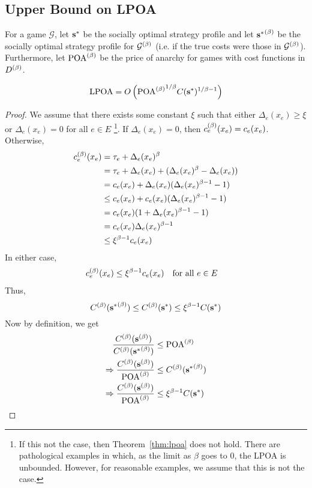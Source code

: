 \documentclass[twoside]{article}
\begin{document}
\begin{multicols}{2}
\section{Upper Bound on LPOA} \label{sec:ub}
For a game $\mathcal{G}$, let $\mathbf{s}^*$ be the socially optimal strategy profile
and let ${\mathbf{s}^*}^{(\beta)}$ be the socially optimal strategy profile for
$\mathcal{G}^{(\beta)}$ (i.e. if the true costs were those in $\mathcal{G}^{(\beta)}$).
Furthermore, let $\text{POA}^{(\beta)}$ be the price of anarchy for games with cost functions in
$D^{(\beta)}$.
\begin{thm} \label{thm:lpoa}
  \[
    \text{LPOA} = O\left({\text{POA}^{(\beta)}}^{1/\beta} C(\mathbf{s}^*)^{1/\beta-1}\right)
  \]
\end{thm}
\begin{proof}
  We assume that there exists some constant $\xi$ such that either
  $\Delta_e(x_e) \ge \xi$ or $\Delta_e(x_e) = 0$ for all $e \in E$
  \footnote{If this not the case, then Theorem~\ref{thm:lpoa} does not hold.
  There are pathological examples in which, as the limit as $\beta$ goes to 0,
  the LPOA is unbounded. However, for reasonable examples, we assume that this
  is not the case.}. If $\Delta_e(x_e) = 0$, then $c_e^{(\beta)}(x_e) = c_e(x_e)$.
  Otherwise,
  \begin{align*}
    c_e^{(\beta)}(x_e) &= \tau_e + \Delta_e(x_e)^\beta \\
    &= \tau_e + \Delta_e(x_e) + (\Delta_e(x_e)^\beta - \Delta_e(x_e)) \\
    &= c_e(x_e) + \Delta_e(x_e)(\Delta_e(x_e)^{\beta-1} - 1) \\
    &\le c_e(x_e) + c_e(x_e)(\Delta_e(x_e)^{\beta-1} - 1) \\
    &= c_e(x_e) (1 + \Delta_e(x_e)^{\beta-1}-1) \\
    &= c_e(x_e) \Delta_e(x_e)^{\beta-1} \\
    &\le \xi^{\beta-1} c_e(x_e)
  \end{align*}
  In either case,
  \begin{align*}
    c_e^{(\beta)}(x_e) &\le \xi^{\beta-1} c_e(x_e) \quad \text{for all }e \in E
  \end{align*}
  Thus,
  \[
    C^{(\beta)}({\mathbf{s}^*}^{(\beta)}) \le C^{(\beta)}(\mathbf{s}^*) \le \xi^{\beta-1} C(\mathbf{s}^*)
  \]
  Now by definition, we get 
  \begin{align*}
  \frac{C\pbet(\s\pbet)}{C\pbet({\s^*}\pbet)} &\le \poab \\
  \Rightarrow \frac{C\pbet(\s\pbet)}{\poab} &\le C\pbet({\s^*}\pbet) \\
  \Rightarrow \frac{C\pbet(\s\pbet)}{\poab} &\le \xi^{\beta-1} C(\s^*)

\end{align*}
\end{proof}
\end{multicols}
\end{document}
